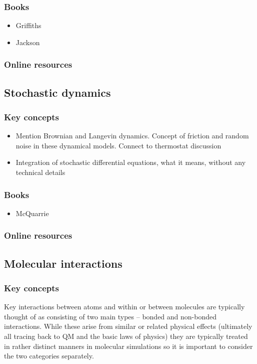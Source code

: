 \documentclass[9pt,bestpractices]{livecoms}
\begin{document}
\subsubsection{Books}
\begin{itemize}
\item Griffiths
\item Jackson
\end{itemize}
\subsubsection{Online resources}

\subsection{Stochastic dynamics}
\subsubsection{Key concepts}
\begin{itemize}
\item Mention Brownian and Langevin dynamics. Concept of friction and random
    noise in these dynamical models. Connect to thermostat discussion
\item Integration of stochastic differential equations, what it means, without
    any technical details
\end{itemize}
\subsubsection{Books}
\begin{itemize}
\item McQuarrie
\end{itemize}
\subsubsection{Online resources}

\subsection{Molecular interactions}
\label{sec:mol_interactions}
\subsubsection{Key concepts}

Key interactions between atoms and within or between molecules are typically
thought of as consisting of two main types -- bonded and non-bonded
interactions.  While these arise from similar or related physical
effects (ultimately all tracing back to QM and the basic laws of
physics) they are typically treated in rather distinct manners in
molecular simulations so it is important to consider the two categories
separately.
\end{document}
